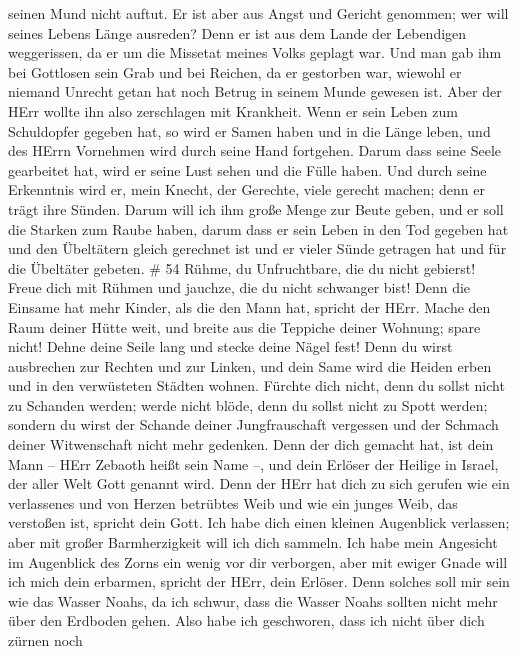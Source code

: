 seinen Mund nicht auftut.  Er ist aber aus Angst und Gericht
genommen; wer will seines Lebens Länge ausreden? Denn er ist aus dem
Lande der Lebendigen weggerissen, da er um die Missetat meines Volks
geplagt war.  Und man gab ihm bei Gottlosen sein Grab und
bei Reichen, da er gestorben war, wiewohl er niemand Unrecht getan hat
noch Betrug in seinem Munde gewesen ist.  Aber der HErr
wollte ihn also zerschlagen mit Krankheit. Wenn er sein Leben zum
Schuldopfer gegeben hat, so wird er Samen haben und in die Länge leben,
und des HErrn Vornehmen wird durch seine Hand fortgehen. 
Darum dass seine Seele gearbeitet hat, wird er seine Lust sehen und die
Fülle haben. Und durch seine Erkenntnis wird er, mein Knecht, der
Gerechte, viele gerecht machen; denn er trägt ihre Sünden. 
Darum will ich ihm große Menge zur Beute geben, und er soll die Starken
zum Raube haben, darum dass er sein Leben in den Tod gegeben hat und den
Übeltätern gleich gerechnet ist und er vieler Sünde getragen hat und für
die Übeltäter gebeten. \# 54  Rühme, du Unfruchtbare, die du
nicht gebierst! Freue dich mit Rühmen und jauchze, die du nicht
schwanger bist! Denn die Einsame hat mehr Kinder, als die den Mann hat,
spricht der HErr.  Mache den Raum deiner Hütte weit, und
breite aus die Teppiche deiner Wohnung; spare nicht! Dehne deine Seile
lang und stecke deine Nägel fest!  Denn du wirst ausbrechen
zur Rechten und zur Linken, und dein Same wird die Heiden erben und in
den verwüsteten Städten wohnen.  Fürchte dich nicht, denn du
sollst nicht zu Schanden werden; werde nicht blöde, denn du sollst nicht
zu Spott werden; sondern du wirst der Schande deiner Jungfrauschaft
vergessen und der Schmach deiner Witwenschaft nicht mehr gedenken.
 Denn der dich gemacht hat, ist dein Mann -- HErr Zebaoth
heißt sein Name --, und dein Erlöser der Heilige in Israel, der aller
Welt Gott genannt wird.  Denn der HErr hat dich zu sich
gerufen wie ein verlassenes und von Herzen betrübtes Weib und wie ein
junges Weib, das verstoßen ist, spricht dein Gott.  Ich habe
dich einen kleinen Augenblick verlassen; aber mit großer Barmherzigkeit
will ich dich sammeln.  Ich habe mein Angesicht im
Augenblick des Zorns ein wenig vor dir verborgen, aber mit ewiger Gnade
will ich mich dein erbarmen, spricht der HErr, dein Erlöser.
 Denn solches soll mir sein wie das Wasser Noahs, da ich
schwur, dass die Wasser Noahs sollten nicht mehr über den Erdboden
gehen. Also habe ich geschworen, dass ich nicht über dich zürnen noch
